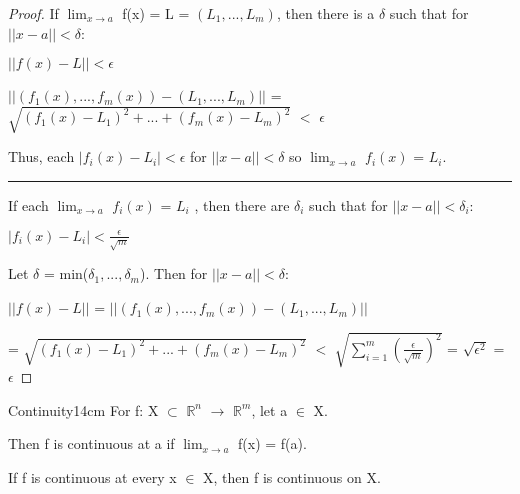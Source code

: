     \begin{proof}
        If $\lim_{x \rightarrow a}$ f(x) = L = $(L_1,...,L_m)$,
        then there is a $\delta$ such that for $||x-a|| < \delta$:

        \hspace{0.5cm}
        $|| f(x) - L || < \epsilon$

        \hspace{0.5cm}
        $|| (f_1(x),...,f_m(x)) - (L_1,...,L_m) ||$
        = $\sqrt{(f_1(x) - L_1)^2 + ... + (f_m(x) - L_m)^2}$
        $<$ $\epsilon$

        Thus, each $|f_i(x) - L_i| < \epsilon$ for $||x-a|| < \delta$
        so $\lim_{x \rightarrow a}$ $f_i(x)$ = $L_i$.

        \rule[0.1cm]{15cm}{0.01cm}

        If each $\lim_{x \rightarrow a}$ $f_i(x)$ = $L_i$ , then there
        are $\delta_i$ such that for $||x-a|| < \delta_i$:

        \hspace{0.5cm}
        $|f_i(x) - L_i| < \frac{\epsilon}{\sqrt{m}}$

        Let $\delta$ = min($\delta_1,...,\delta_m$).
        Then for $||x-a|| < \delta$:

        \hspace{0.5cm}
        $|| f(x) - L ||$
        = $|| (f_1(x),...,f_m(x)) - (L_1,...,L_m) ||$

        \hspace{2.7cm}
        = $\sqrt{(f_1(x) - L_1)^2 + ... + (f_m(x) - L_m)^2}$
        $<$ $\sqrt{\sum_{i=1}^m (\frac{\epsilon}{\sqrt{m}})^2}$
        = $\sqrt{\epsilon^2}$
        = $\epsilon$
    \end{proof}

    \vspace{0.5cm}



    \begin{definition}{Continuity}{14cm}
        For f: X $\subset$ $\mathbb{R}^n$ $\rightarrow$ $\mathbb{R}^m$,
        let a $\in$ X.

        Then f is {\color{lblue} continuous} at a if
        $\lim_{x \rightarrow a}$ f(x) = f(a).

        If f is continuous at every x $\in$ X, then f is continuous on X.
    \end{definition}

    \newpage



